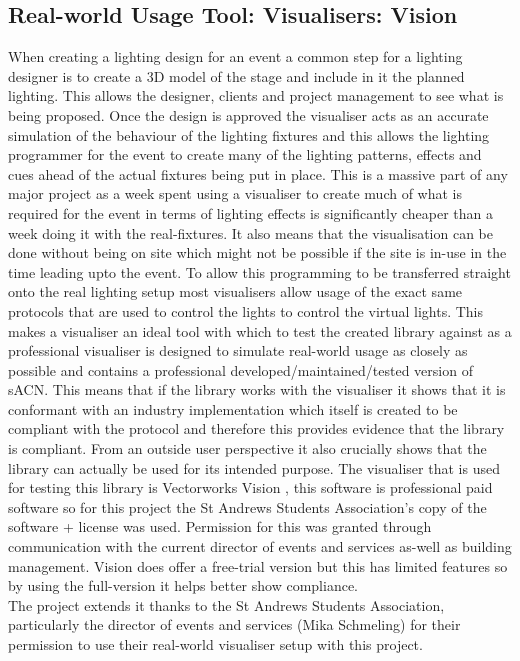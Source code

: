 \documentclass[11pt,a4paper]{article}
\begin{document}
\subsection{Real-world Usage Tool: Visualisers: Vision}
When creating a lighting design for an event a common step for a lighting designer is to create a 3D model of the stage and include in it the planned lighting. This allows the designer, clients and project management to see what is being proposed. Once the design is approved the visualiser acts as an accurate simulation of the behaviour of the lighting fixtures and this allows the lighting programmer for the event to create many of the lighting patterns, effects and cues ahead of the actual fixtures being put in place. This is a massive part of any major project as a week spent using a visualiser to create much of what is required for the event in terms of lighting effects is significantly cheaper than a week doing it with the real-fixtures. It also means that the visualisation can be done without being on site which might not be possible if the site is in-use in the time leading upto the event. To allow this programming to be transferred straight onto the real lighting setup most visualisers allow usage of the exact same protocols that are used to control the lights to control the virtual lights. This makes a visualiser an ideal tool with which to test the created library against as a professional visualiser is designed to simulate real-world usage as closely as possible and contains a professional developed/maintained/tested version of sACN. This means that if the library works with the visualiser it shows that it is conformant with an industry implementation which itself is created to be compliant with the protocol and therefore this provides evidence that the library is compliant. From an outside user perspective it also crucially shows that the library can actually be used for its intended purpose. The visualiser that is used for testing this library is Vectorworks Vision \cite{VISION}, this software is professional paid software so for this project the St Andrews Students Association's copy of the software + license was used. Permission for this was granted through communication with the current director of events and services as-well as building management. Vision does offer a free-trial version but this has limited features so by using the full-version it helps better show compliance. \\

The project extends it thanks to the St Andrews Students Association, particularly the director of events and services (Mika Schmeling) for their permission to use their real-world visualiser setup with this project.
\end{document}
